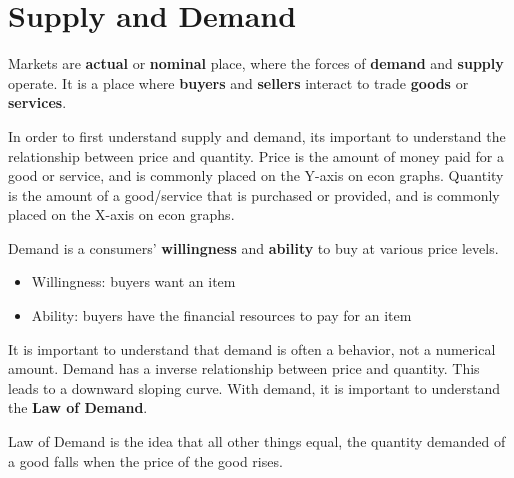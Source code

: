 \section{Supply and Demand}
\begin{definition}
    Markets are \textbf{actual} or \textbf{nominal} place, where the forces of \textbf{demand} and \textbf{supply} operate. It is a place where \textbf{buyers} and \textbf{sellers} interact to trade \textbf{goods} or \textbf{services}. 
\end{definition}

In order to first understand supply and demand, its important to understand the relationship between price and quantity. Price is the amount of money paid for a good or service, and is commonly placed on the Y-axis on econ graphs. Quantity is the amount of a good/service that is purchased or provided, and is commonly placed on the X-axis on econ graphs. 

\begin{definition}
    Demand is a consumers' \textbf{willingness} and \textbf{ability} to buy at various price levels.
    \begin{itemize}
        \item Willingness: buyers want an item
        \item Ability: buyers have the financial resources to pay for an item
    \end{itemize}
\end{definition}

It is important to understand that demand is often a behavior, not a numerical amount. Demand has a inverse relationship between price and quantity. This leads to a downward sloping curve. With demand, it is important to understand the \textbf{Law of Demand}.
\begin{definition}
    Law of Demand is the idea that all other things equal, the quantity demanded of a good falls when the price of the good rises. 
\end{definition}


